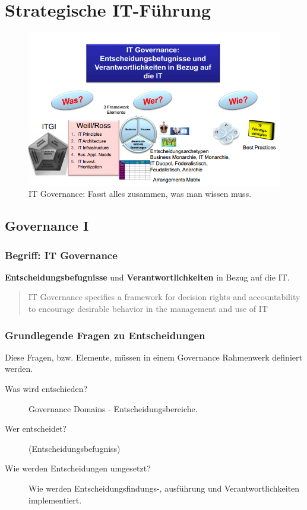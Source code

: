 \chapter{Strategische IT-Führung}

\begin{figure}[h!]
\centering
\includegraphics[width=0.8\linewidth]{fig/governance-big-picture}
\caption{IT Governance: Fasst alles zusammen, was man wissen muss.}
\label{fig:governance-big-picture}
\end{figure}

\section{Governance I}

\subsection{Begriff: IT Governance}
\textbf{Entscheidungsbefugnisse} und \textbf{Verantwortlichkeiten} in Bezug auf die IT.
\begin{quote}
	IT Governance specifies a framework for decision rights and accountability to encourage desirable behavior in the management and use of IT
\end{quote}


\subsection{Grundlegende Fragen zu Entscheidungen}
Diese Fragen, bzw. Elemente, müssen in einem Governance Rahmenwerk definiert werden.
\begin{description}
	\item[Was wird entschieden?] Governance Domains - Entscheidungsbereiche.
	\item[Wer entscheidet?] (Entscheidungsbefugniss)
	\item[Wie werden Entscheidungen umgesetzt?] Wie werden Entscheidungsfindungs-, ausführung und Verantwortlichkeiten implementiert.
\end{description}

